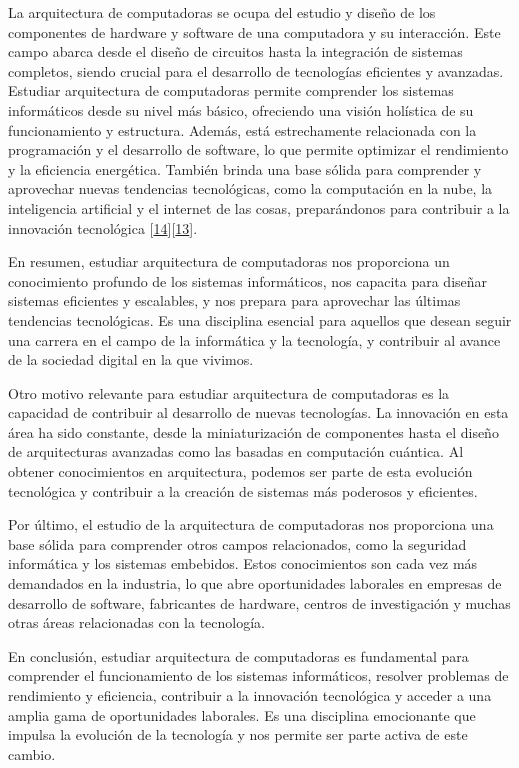 \documentclass[12pt,twoside]{templates/unerthesis}
\begin{document}
La arquitectura de computadoras se ocupa del estudio y diseño de los componentes de hardware y software de una computadora y su interacción. Este campo abarca desde el diseño de circuitos hasta la integración de sistemas completos, siendo crucial para el desarrollo de tecnologías eficientes y avanzadas. Estudiar arquitectura de computadoras permite comprender los sistemas informáticos desde su nivel más básico, ofreciendo una visión holística de su funcionamiento y estructura. Además, está estrechamente relacionada con la programación y el desarrollo de software, lo que permite optimizar el rendimiento y la eficiencia energética. También brinda una base sólida para comprender y aprovechar nuevas tendencias tecnológicas, como la computación en la nube, la inteligencia artificial y el internet de las cosas, preparándonos para contribuir a la innovación tecnológica {[}\protect\hyperlink{ref-stallings_computer_2013}{14}{]}{[}\protect\hyperlink{ref-hennessy_computer_2012}{13}{]}.

En resumen, estudiar arquitectura de computadoras nos proporciona un conocimiento profundo de los sistemas informáticos, nos capacita para diseñar sistemas eficientes y escalables, y nos prepara para aprovechar las últimas tendencias tecnológicas. Es una disciplina esencial para aquellos que desean seguir una carrera en el campo de la informática y la tecnología, y contribuir al avance de la sociedad digital en la que vivimos.

Otro motivo relevante para estudiar arquitectura de computadoras es la capacidad de contribuir al desarrollo de nuevas tecnologías. La innovación en esta área ha sido constante, desde la miniaturización de componentes hasta el diseño de arquitecturas avanzadas como las basadas en computación cuántica. Al obtener conocimientos en arquitectura, podemos ser parte de esta evolución tecnológica y contribuir a la creación de sistemas más poderosos y eficientes.

Por último, el estudio de la arquitectura de computadoras nos proporciona una base sólida para comprender otros campos relacionados, como la seguridad informática y los sistemas embebidos. Estos conocimientos son cada vez más demandados en la industria, lo que abre oportunidades laborales en empresas de desarrollo de software, fabricantes de hardware, centros de investigación y muchas otras áreas relacionadas con la tecnología.

En conclusión, estudiar arquitectura de computadoras es fundamental para comprender el funcionamiento de los sistemas informáticos, resolver problemas de rendimiento y eficiencia, contribuir a la innovación tecnológica y acceder a una amplia gama de oportunidades laborales. Es una disciplina emocionante que impulsa la evolución de la tecnología y nos permite ser parte activa de este cambio.
\end{document}
